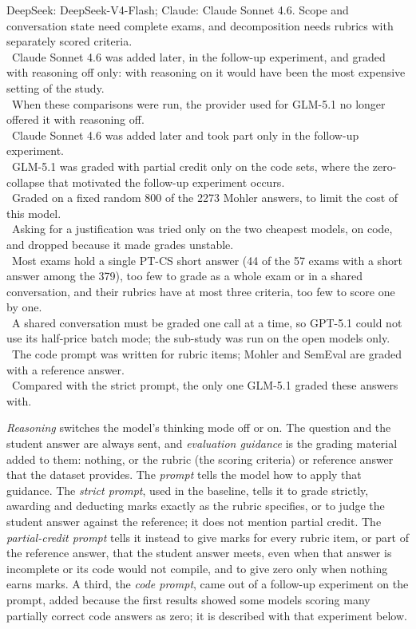 \begin{table}[!tb]
\vspace{3pt}
\parbox{\textwidth}{\scriptsize\raggedright
DeepSeek: DeepSeek-V4-Flash; Claude: Claude Sonnet 4.6. Scope and conversation state need complete exams, and
decomposition needs rubrics with separately scored criteria.\\
~Claude Sonnet 4.6 was added later, in the follow-up experiment, and graded with reasoning off only:
with reasoning on it would have been the most expensive setting of the study.\\
~When these comparisons were run, the provider used for GLM-5.1 no longer offered it with reasoning off.\\
~Claude Sonnet 4.6 was added later and took part only in the follow-up experiment.\\
~GLM-5.1 was graded with partial credit only on the code sets, where the zero-collapse that motivated the
follow-up experiment occurs.\\
~Graded on a fixed random 800 of the 2273 Mohler answers, to limit the cost of this model.\\
~Asking for a justification was tried only on the two cheapest models, on code, and dropped because it
made grades unstable.\\
~Most exams hold a single PT-CS short answer (44 of the 57 exams with a short answer among the 379), too few to grade as a
whole exam or in a shared conversation, and their rubrics have at most three criteria, too few to score one by
one.\\
~A shared conversation must be graded one call at a time, so GPT-5.1 could not use its half-price batch
mode; the sub-study was run on the open models only.\\
~The code prompt was written for rubric items; Mohler and SemEval are graded with a reference answer.\\
~Compared with the strict prompt, the only one GLM-5.1 graded these answers with.}
\end{table}%
\emph{Reasoning} switches the model's
thinking mode off or on. The question and the student answer are always sent, and \emph{evaluation guidance} is
the grading material added to them: nothing, or the rubric (the scoring criteria) or reference answer that the
dataset provides. The \emph{prompt} tells the model how to apply that guidance. The \emph{strict prompt}, used
in the baseline, tells it to grade strictly, awarding and deducting marks exactly as the rubric specifies, or to
judge the student answer against the reference; it does not mention partial credit. The \emph{partial-credit
prompt} tells it instead to give marks for every rubric item, or part of the reference answer, that the student
answer meets, even when that answer is incomplete or its code would not compile, and to give zero only when
nothing earns marks. A third, the \emph{code prompt}, came out of a follow-up experiment on the prompt, added
because the first results showed some models scoring many partially correct code answers as zero; it is
described with that experiment below.


